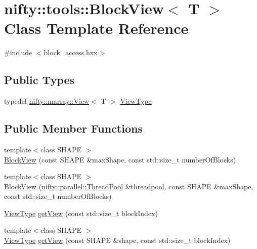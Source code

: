\hypertarget{classnifty_1_1tools_1_1BlockView}{}\section{nifty\+:\+:tools\+:\+:Block\+View$<$ T $>$ Class Template Reference}
\label{classnifty_1_1tools_1_1BlockView}


{\ttfamily \#include $<$block\+\_\+access.\+hxx$>$}

\subsection*{Public Types}
\begin{DoxyCompactItemize}
\item 
typedef \hyperlink{classandres_1_1View}{nifty\+::marray\+::\+View}$<$ T $>$ \hyperlink{classnifty_1_1tools_1_1BlockView_acaadee9e8a7dc696acf1ebad24bd431d}{View\+Type}
\end{DoxyCompactItemize}
\subsection*{Public Member Functions}
\begin{DoxyCompactItemize}
\item 
{\footnotesize template$<$class S\+H\+A\+PE $>$ }\\\hyperlink{classnifty_1_1tools_1_1BlockView_a1b591e8f45f3bed139be4e0c3389120b}{Block\+View} (const S\+H\+A\+PE \&max\+Shape, const std\+::size\+\_\+t number\+Of\+Blocks)
\item 
{\footnotesize template$<$class S\+H\+A\+PE $>$ }\\\hyperlink{classnifty_1_1tools_1_1BlockView_abb51114af3076842c35284562c13ca72}{Block\+View} (\hyperlink{classnifty_1_1parallel_1_1ThreadPool}{nifty\+::parallel\+::\+Thread\+Pool} \&threadpool, const S\+H\+A\+PE \&max\+Shape, const std\+::size\+\_\+t number\+Of\+Blocks)
\item 
\hyperlink{classnifty_1_1tools_1_1BlockView_acaadee9e8a7dc696acf1ebad24bd431d}{View\+Type} \hyperlink{classnifty_1_1tools_1_1BlockView_abbd30baab53cb89ded00f37214b6056d}{get\+View} (const std\+::size\+\_\+t block\+Index)
\item 
{\footnotesize template$<$class S\+H\+A\+PE $>$ }\\\hyperlink{classnifty_1_1tools_1_1BlockView_acaadee9e8a7dc696acf1ebad24bd431d}{View\+Type} \hyperlink{classnifty_1_1tools_1_1BlockView_aa5844a6a85c4747084f64e44f1456fe7}{get\+View} (const S\+H\+A\+PE \&shape, const std\+::size\+\_\+t block\+Index)
\end{DoxyCompactItemize}


